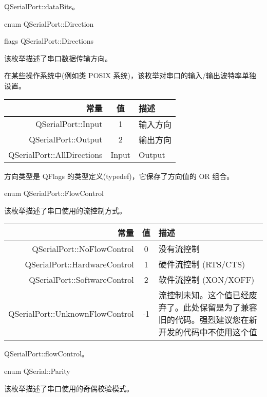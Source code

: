 \begin{seeAlso}
QSerialPort::dataBits。
\end{seeAlso}

enum QSerialPort::Direction

flags QSerialPort::Directions

该枚举描述了串口数据传输方向。

\begin{notice}
在某些操作系统中(例如类 POSIX 系统)，该枚举对串口的输入/输出波特率单独设置。
\end{notice}

\begin{tabular}{|r|c|l|}
\hline
常量	&值&	描述 \\ 
\hline 
QSerialPort::Input	& 1 &	输入方向 \\ 
\hline
QSerialPort::Output	 &2	 &输出方向 \\ 
\hline
QSerialPort::AllDirections&	Input&	Output \\
\hline
\end{tabular}


方向类型是 QFlags 的类型定义(typedef)，它保存了方向值的 OR 组合。

enum QSerialPort::FlowControl

该枚举描述了串口使用的流控制方式。

\begin{tabular}{|r|c|m{20em}|}
\hline
常量	&值&	描述 \\ 
\hline 
QSerialPort::NoFlowControl&	0	&没有流控制 \\ 
\hline
QSerialPort::HardwareControl&	1&	硬件流控制 (RTS/CTS) \\ 
\hline
QSerialPort::SoftwareControl&	2	&软件流控制 (XON/XOFF) \\ 
\hline
QSerialPort::UnknownFlowControl	&-1 &	流控制未知。这个值已经废弃了。此处保留是为了兼容旧的代码。强烈建议您在新开发的代码中不使用这个值 \\ 
\hline
\end{tabular}

\begin{seeAlso}
QSerialPort::flowControl。
\end{seeAlso}

enum QSerial::Parity

该枚举描述了串口使用的奇偶校验模式。

